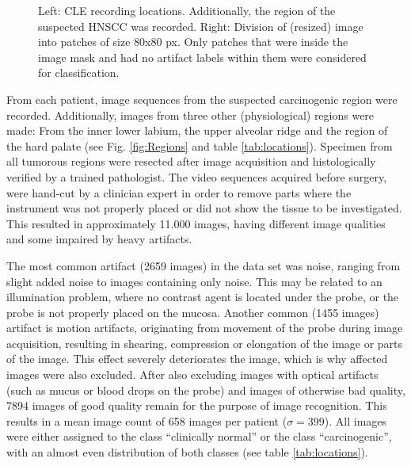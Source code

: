 \documentclass[fleqn,10pt]{wlscirep}
\begin{document}
\begin{figure}[!t]
\centering
{}
\caption{Left: CLE recording locations. Additionally, the region of the
  suspected HNSCC was recorded. Right: Division of (resized) image into patches of size 80x80 px. Only
  patches that were inside the image mask and had no artifact labels
  within them were considered for classification.}
\end{figure}

From each patient, image sequences from the suspected carcinogenic region
were recorded. Additionally, images from three other (physiological) regions were made: From the inner lower
labium, the upper alveolar ridge and the region of the hard palate (see
Fig. \ref{fig:Regions} and table \ref{tab:locations}). Specimen from all tumorous regions were resected after image acquisition and
histologically verified by a trained pathologist. The video
sequences acquired before surgery, were hand-cut
by a clinician expert in order to remove parts where the instrument was not
properly placed or did not show the tissue to be investigated. This resulted in
approximately 11.000 images, having different image qualities and some
impaired by heavy artifacts.

The most common artifact (2659 images) in the data set was noise,
ranging from slight added noise to images containing only noise.
This may be related to an illumination problem, where no contrast
agent is located under the probe, or the probe is not properly placed
on the mucosa.
Another common (1455 images) artifact is motion artifacts, originating from movement of the probe during image acquisition, resulting in shearing, compression or elongation of the image or parts of the image. This effect severely deteriorates the image, which is why affected images were also excluded.
After also excluding images with optical artifacts (such as mucus or blood drops on the probe) and images of otherwise bad quality, 7894 %
 images of good quality remain for the purpose of image recognition. This results in a mean image count of 658 images per patient ($\sigma=399$). All images were either assigned to the class ``clinically normal'' or the class ``carcinogenic'', with an almost even distribution of both classes (see table \ref{tab:locations}).
\end{document}

